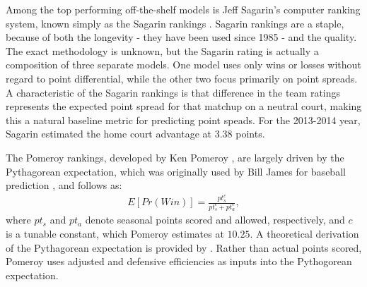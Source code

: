 \documentclass[letterpaper,12pt]{article}
\begin{document}
Among the top performing off-the-shelf models is Jeff Sagarin's computer ranking system, known simply as the Sagarin rankings \citep{sagarin}. Sagarin rankings are a staple, because of both the longevity  - they have been used since 1985 - and the quality. The exact methodology is unknown, but the Sagarin rating is actually a composition of three separate models. One model uses only wins or losses without regard to point differential, while the other two focus primarily on point spreads. A characteristic of the Sagarin rankings is that difference in the team ratings represents the expected point spread for that matchup on a neutral court, making this a natural baseline metric for predicting point speads. For the 2013-2014 year, Sagarin estimated the  home court advantage at 3.38 points.

The Pomeroy rankings, developed by Ken Pomeroy \citep{kenpom.com}, are largely driven by the Pythagorean expectation, which was originally used by Bill James for baseball prediction \citep{james}, and follows as:
\begin{eqnarray}
E[Pr(Win)] = \frac{pt_s^c}{pt_s^c + pt_a^c},
\end{eqnarray}
where $pt_s$ and $pt_a$ denote seasonal points scored and allowed, respectively, and $c$ is a tunable constant, which Pomeroy estimates at $10.25$.  
A theoretical derivation of the Pythagorean expectation is provided by \cite{miller2007}.
Rather than actual points scored, Pomeroy uses adjusted and defensive efficiencies as inputs into the Pythogorean expectation.
\end{document}
